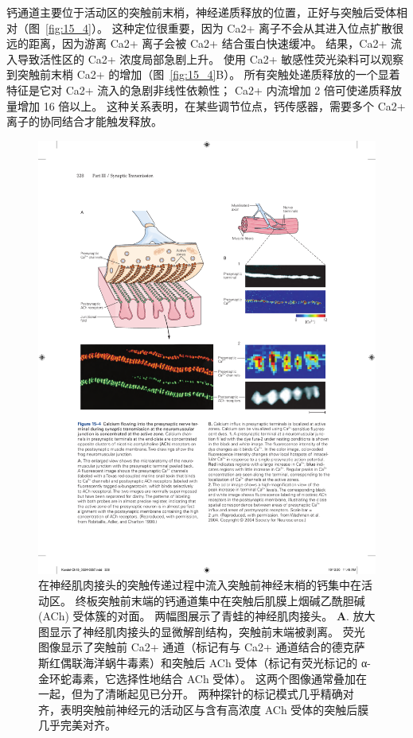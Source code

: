钙通道主要位于活动区的突触前末梢，神经递质释放的位置，正好与突触后受体相对（图~\ref{fig:15_4}）。 
这种定位很重要，因为 Ca2+ 离子不会从其进入位点扩散很远的距离，因为游离 Ca2+ 离子会被 Ca2+ 结合蛋白快速缓冲。 
结果，Ca2+ 流入导致活性区的 Ca2+ 浓度局部急剧上升。 
使用 Ca2+ 敏感性荧光染料可以观察到突触前末梢 Ca2+ 的增加（图~\ref{fig:15_4}B）。
所有突触处递质释放的一个显着特征是它对 Ca2+ 流入的急剧非线性依赖性；
Ca2+ 内流增加 2 倍可使递质释放量增加 16 倍以上。 
这种关系表明，在某些调节位点，钙传感器，需要多个 Ca2+ 离子的协同结合才能触发释放。


\begin{figure}[htbp]
	\centering
	\includegraphics[width=0.9\linewidth]{chap15/fig_15_4}
	\caption{在神经肌肉接头的突触传递过程中流入突触前神经末梢的钙集中在活动区。
	终板突触前末端的钙通道集中在突触后肌膜上烟碱乙酰胆碱 (ACh) 受体簇的对面。
	两幅图展示了青蛙的神经肌肉接头。
	\textbf{A}. 放大图显示了神经肌肉接头的显微解剖结构，突触前末端被剥离。
	荧光图像显示了突触前 Ca2+ 通道（标记有与 Ca2+ 通道结合的德克萨斯红偶联海洋蜗牛毒素）和突触后 ACh 受体（标记有荧光标记的 α-金环蛇毒素，它选择性地结合 ACh 受体）。
	这两个图像通常叠加在一起，但为了清晰起见已分开。
	两种探针的标记模式几乎精确对齐，表明突触前神经元的活动区与含有高浓度 ACh 受体的突触后膜几乎完美对齐\cite{robitaille1990strategic}。
}
\end{figure}
